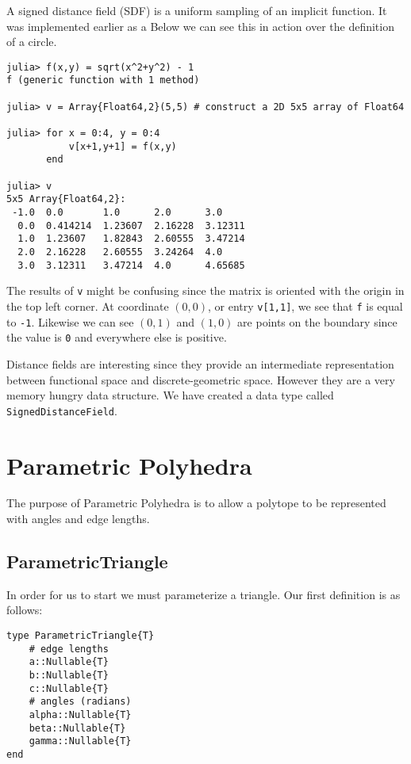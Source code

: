 A signed distance field (SDF) is a uniform sampling of an implicit function.
It was implemented earlier as a 
Below
we can see this in action over the definition of a circle.

\begin{lstlisting}
julia> f(x,y) = sqrt(x^2+y^2) - 1
f (generic function with 1 method)

julia> v = Array{Float64,2}(5,5) # construct a 2D 5x5 array of Float64

julia> for x = 0:4, y = 0:4
           v[x+1,y+1] = f(x,y)
       end

julia> v
5x5 Array{Float64,2}:
 -1.0  0.0       1.0      2.0      3.0    
  0.0  0.414214  1.23607  2.16228  3.12311
  1.0  1.23607   1.82843  2.60555  3.47214
  2.0  2.16228   2.60555  3.24264  4.0    
  3.0  3.12311   3.47214  4.0      4.65685
\end{lstlisting}

The results of \texttt{v} might be confusing since the matrix is oriented with
the origin in the top left corner. At coordinate $(0,0)$, or entry \texttt{v[1,1]},
we see that \texttt{f} is
equal to \texttt{-1}. Likewise we can see $(0,1)$ and $(1,0)$ are points on
the boundary since the value is \texttt{0} and everywhere else is positive.

Distance fields are interesting since they provide an intermediate representation
between functional space and discrete-geometric space. However they are
a very memory hungry data structure. We have created a data type called
\texttt{SignedDistanceField}.



\section{Parametric Polyhedra}

The purpose of Parametric Polyhedra is to allow a polytope to
be represented with angles and edge lengths.


\subsection{ParametricTriangle}
In order for
us to start we must parameterize a triangle. Our first
definition is as follows:

\begin{lstlisting}
type ParametricTriangle{T}
    # edge lengths
    a::Nullable{T}
    b::Nullable{T}
    c::Nullable{T}
    # angles (radians)
    alpha::Nullable{T}
    beta::Nullable{T}
    gamma::Nullable{T}
end
\end{lstlisting}

